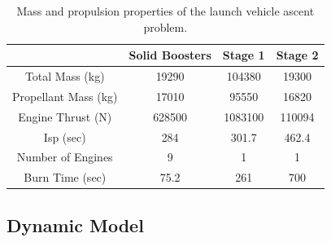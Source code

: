 \documentclass[10pt,final]{report}
\begin{document}
\begin{table}[htdp]
\centering
\caption{Mass and propulsion properties of the launch vehicle ascent
  problem. \label{table: launch vehicle properties}}
\begin{tabular}{|c|c|c|c|}
\hline
 & Solid Boosters & Stage 1 & Stage 2 \\
 \hline \hline
 Total Mass (kg) & 19290 & 104380 & 19300 \\
 \hline
 Propellant Mass (kg) & 17010 & 95550 & 16820 \\
 \hline
 Engine Thrust (N) & 628500 & 1083100 & 110094 \\
 \hline
 Isp (sec) & 284 & 301.7 & 462.4 \\
 \hline
 Number of Engines & 9 & 1 & 1 \\
 \hline
 Burn Time (sec) & 75.2 & 261 & 700 \\
 \hline
\end{tabular}
\end{table}

\subsection{Dynamic Model}
\end{document}
